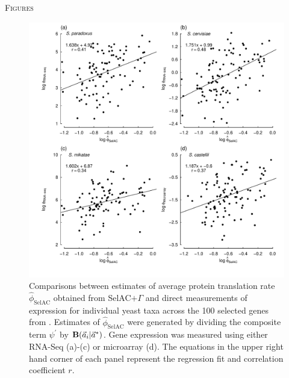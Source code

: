 \documentclass[12pt,letterpaper]{article}
\renewcommand{\section}[1]{%
\bigskip
\begin{center}
\begin{Large}
\normalfont\scshape #1
\medskip
\end{Large}
\end{center}}
\newcommand{\Funcaveci}{\ensuremath{\Func(\aveci|\aoptvec)}\xspace}
\newcommand{\Func}{\ensuremath{\text{\textbf{B}}}\xspace}
\newcommand{\selac}{SelAC\xspace}
\newcommand{\selacplusgamma}{SelAC$+\Gamma$\xspace}
\newcommand{\aoptvec}{\ensuremath{\Vec{a}^*}\xspace}
\newcommand{\aveci}{\ensuremath{\Vec{a}_i}\xspace}
\newcommand{\phihat}{\ensuremath{\hat{\phi}_{\text{\selac}}}\xspace}
\newcommand{\psiprime}{\ensuremath{\psi^\prime}\xspace}
\begin{document}
\clearpage %

\section{Figures}

\begin{figure}[H]
  \centering
  \includegraphics[width=0.9\linewidth]{FIGURE_1_SelACwG_vs_Empirical_by_spp.pdf}
  \caption{Comparisons between estimates of average protein translation rate $\phihat$ obtained from \selacplusgamma and direct measurements of expression for individual yeast taxa across the 100 selected genes from \citet{SalichosAndRokas2013}.
        Estimates of $\phihat$ were generated by dividing the composite term $\psiprime$ by \Funcaveci.
        Gene expression was measured using either RNA-Seq (a)-(c) or microarray (d). The equations in the upper right hand corner of each panel represent the regression fit and correlation coefficient $r$.
  }
  \label{fig:PhivsEmpirical}
\end{figure}
\end{document}
